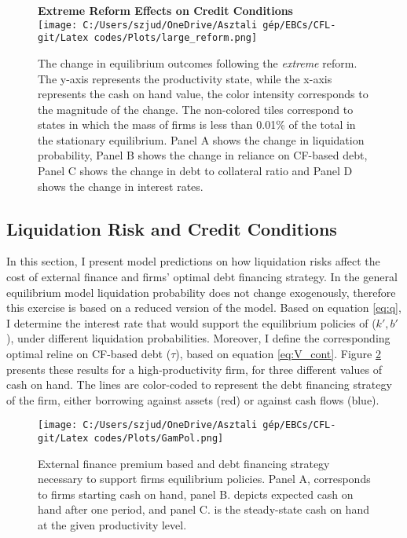 \documentclass[12pt]{article}
\begin{document}
\begin{figure}[H]  %
    \centering  
    \textbf{\large Extreme Reform Effects on Credit Conditions \vspace{3mm} \\}   %
    \texttt{[image: C:/Users/szjud/OneDrive/Asztali gép/EBCs/CFL-git/Latex codes/Plots/large\_reform.png]}
    \caption{\small The change in equilibrium outcomes following the \textit{extreme} reform. The y-axis represents the productivity state, while the x-axis represents the cash on hand value, the color intensity corresponds to the magnitude of the change. The non-colored tiles correspond to states in which the mass of firms is less than 0.01\% of the total in the stationary equilibrium. Panel A shows the change in liquidation probability, Panel B shows the change in reliance on CF-based debt, Panel C shows the change in debt to collateral ratio and Panel D shows the change in interest rates. }
    \label{chart:extpoleffects}
\end{figure}


\subsection{Liquidation Risk and Credit Conditions \label{sec:appliqrisk}}

In this section, I present model predictions on how liquidation risks affect the cost of external finance and firms' optimal debt financing strategy. In the general equilibrium model liquidation probability does not change exogenously, therefore this exercise is based on a reduced version of the model. Based on equation \ref{eq:q}, I determine the interest rate that would support the equilibrium policies of ($k',b'$), under different liquidation probabilities. Moreover, I define the corresponding optimal reline on CF-based debt ($\tau$), based on equation \ref{eq:V_cont}. Figure \ref{chart:liqprob} presents these results for a high-productivity firm, for three different values of cash on hand. The lines are color-coded to represent the debt financing strategy of the firm, either borrowing against assets (red) or against cash flows (blue). \\

\begin{figure}[H]  %
    \centering  
    \texttt{[image: C:/Users/szjud/OneDrive/Asztali gép/EBCs/CFL-git/Latex codes/Plots/GamPol.png]}
    \caption{ \small External finance premium based and debt financing strategy necessary to support firms equilibrium policies. Panel A, corresponds to firms starting cash on hand, panel B. depicts expected cash on hand after one period, and panel C. is the steady-state cash on hand at the given productivity level.}
    \label{chart:liqprob}
\end{figure}
\end{document}
